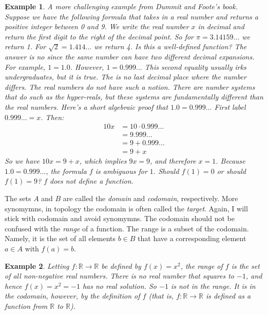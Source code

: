\documentclass{article}
\theoremstyle{plain}
\theoremstyle{normal}
\newtheorem{example}{Example}[section]
\begin{document}
        \begin{example}
            A more challenging example from Dummit and Foote's book. Suppose
            we have the following formula that takes in a real number and
            returns a positive integer between 0 and 9. We write the real
            number $x$ in decimal and return the first digit to the right of
            the decimal point. So for $\pi=3.14159...$ we return 1. For
            $\sqrt{2}=1.414...$ we return 4. Is this a well-defined function?
            The answer is no since the same number can have two different
            decimal expansions. For example, $1=1.0$. However,
            $1=0.999...$ This second equality usually irks undergraduates, but
            it is true. The is no \textit{last decimal place} where the
            number differs. The real numbers do not have such a notion. There
            are number systems that do such as the hyper-reals, but these
            systems are fundamentally different than the real numbers. Here's
            a short algebraic proof that $1.0=0.999...$ First label
            $0.999...=x$. Then:
            \begin{align}
                10x&=10\cdot0.999...\\
                    &=9.999...\\
                    &=9+0.999...\\
                    &=9+x
            \end{align}
            So we have $10x=9+x$, which implies $9x=9$, and therefore $x=1$.
            Because $1.0=0.999...$, the formula $f$ is ambiguous for $1$.
            Should $f(1)=0$ or should $f(1)=9$? $f$ does not define a function.
        \end{example}
        The sets $A$ and $B$ are called the \textit{domain} and
        \textit{codomain}, respectively. More synomymns, in topology the
        codomain is often called the \textit{target}. Again, I will stick with
        codomain and avoid synomymns. The codomain should not be confused with
        the \textit{range} of a function. The range is a subset of the codomain.
        Namely, it is the set of all elements $b\in{B}$ that have a
        corresponding element $a\in{A}$ with $f(a)=b$.
        \begin{example}
            Letting $f:\mathbb{R}\rightarrow\mathbb{R}$ be defined by
            $f(x)=x^{2}$, the range of $f$ is the set of all
            \textit{non-negative} real numbers. There is no real number that
            squares to $-1$, and hence $f(x)=x^{2}=-1$ has no real solution.
            So $-1$ is \textit{not} in the range. It is in the codomain,
            however, by the definition of $f$
            (that is, $f:\mathbb{R}\rightarrow\mathbb{R}$ is defined as a
            function from $\mathbb{R}$ to $\mathbb{R}$).
        \end{example}
\end{document}
